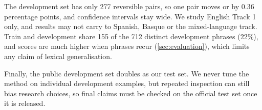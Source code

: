 The development set has only 277 reversible pairs, so one pair moves \SoftCons{} or \HardCons{} by 0.36 percentage points, and confidence intervals stay wide. We study English Track 1 only, and results may not carry to Spanish, Basque or the mixed-language track. Train and development share 155 of the 712 distinct development phrases (22\%), and scores are much higher when phrases recur (\cref{sec:evaluation}), which limits any claim of lexical generalisation.

Finally, the public development set doubles as our test set. We never tune the method on individual development examples, but repeated inspection can still bias research choices, so final claims must be checked on the official test set once it is released.
